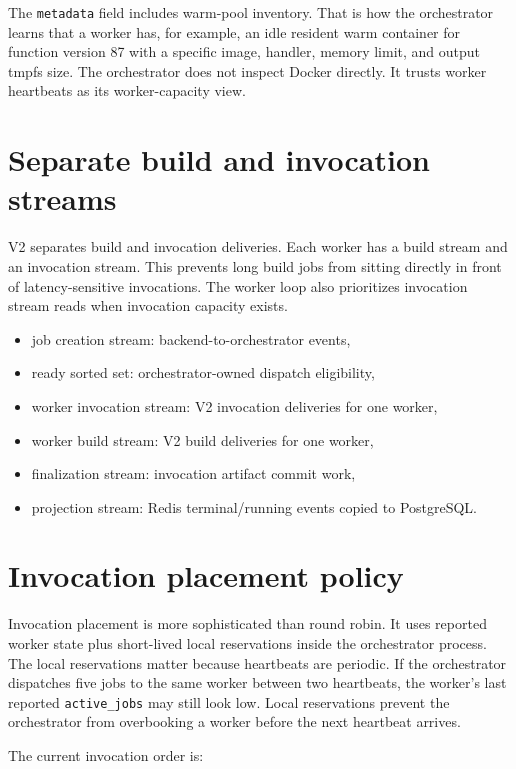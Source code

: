 \documentclass[12pt,a4paper]{report}
\newcommand{\file}[1]{\texttt{#1}}
\begin{document}
The \file{metadata} field includes warm-pool inventory. That is how the
orchestrator learns that a worker has, for example, an idle resident warm
container for function version 87 with a specific image, handler, memory limit,
and output tmpfs size. The orchestrator does not inspect Docker directly. It
trusts worker heartbeats as its worker-capacity view.

\section{Separate build and invocation streams}

V2 separates build and invocation deliveries. Each worker has a build stream and
an invocation stream. This prevents long build jobs from sitting directly in
front of latency-sensitive invocations. The worker loop also prioritizes
invocation stream reads when invocation capacity exists.

\begin{itemize}[leftmargin=1.2cm]
  \item job creation stream: backend-to-orchestrator events,
  \item ready sorted set: orchestrator-owned dispatch eligibility,
  \item worker invocation stream: V2 invocation deliveries for one worker,
  \item worker build stream: V2 build deliveries for one worker,
  \item finalization stream: invocation artifact commit work,
  \item projection stream: Redis terminal/running events copied to PostgreSQL.
\end{itemize}

\section{Invocation placement policy}

Invocation placement is more sophisticated than round robin. It uses reported
worker state plus short-lived local reservations inside the orchestrator
process. The local reservations matter because heartbeats are periodic. If the
orchestrator dispatches five jobs to the same worker between two heartbeats, the
worker's last reported \file{active\_jobs} may still look low. Local reservations
prevent the orchestrator from overbooking a worker before the next heartbeat
arrives.

The current invocation order is:
\end{document}
